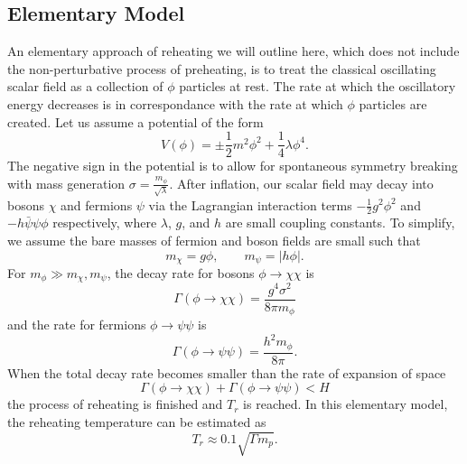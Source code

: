 \documentclass[10pt,letterpaper]{article}
\begin{document}
\subsection{Elementary Model}
An elementary approach of reheating we will outline here, which does not include the non-perturbative process of preheating, is to treat the classical oscillating scalar field as a collection of $\phi$ particles at rest. The rate at which the oscillatory energy decreases is in correspondance with the rate at which $\phi$ particles are created. Let us assume a potential of the form
\[
	V(\phi) = \pm \frac12 m^2\phi^2 +\frac14 \lambda \phi^4.
\]
The negative sign in the potential is to allow for spontaneous symmetry breaking with mass generation $\sigma = \frac{m_\phi}{\sqrt \lambda}$. 
After inflation, our scalar field may decay into bosons $\chi$ and fermions $\psi$ via the Lagrangian interaction terms $-\frac12 g^2\phi^2$ and $-h\bar\psi\psi\phi$ respectively, where $\lambda$, $g$, and $h$ are small coupling constants. To simplify, we assume the bare masses of fermion and boson fields are small such that 
\[
	m_\chi = g\phi,\qquad m_\psi = |h\phi|.
\]
For $m_\phi \gg m_\chi,m_\psi$, the decay rate for bosons $\phi \to \chi\chi$ is
\[
	\Gamma(\phi \to \chi\chi) = \frac{g^4\sigma^2}{8\pi m_\phi}
\]
and the rate for fermions $\phi \to \psi\psi$ is
\[
	\Gamma(\phi\to\psi\psi) = \frac{h^2 m_\phi}{8\pi}.
\]
When the total decay rate becomes smaller than the rate of expansion of space
\[
	\Gamma(\phi \to \chi\chi) +\Gamma(\phi\to\psi\psi) < H
\]
the process of reheating is finished and $T_r$ is reached. In this elementary model, the reheating temperature can be estimated as
\[
	T_r \approx 0.1\sqrt{\Gamma m_p}.
\]
\end{document}
